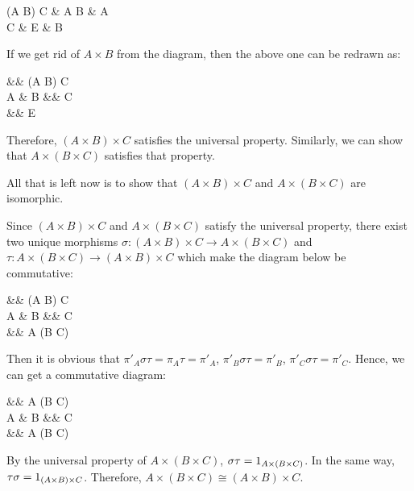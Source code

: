 {    \begin{cd}[sep=large]
        (A \times B) \times C \ar[r,"\pi_{A \times B}"] \ar[d,"\pi_C"] \& A \times B \ar[r,"\pi_A"] \ar[dr,"\pi_B"{pos=0.8}] \& A \\
        C \& E \ar[l,"f_C"]    \ar[ur,"f_A"{pos=0.8},swap] \ar[r,"f_B"] \& B
    \end{cd}

    If we get rid of $A \times B$ from the diagram, then the above one can be redrawn as:

    \begin{cd}
        \&\& (A \times B) \times C \ar[lld,"\pi_A \pi_{A \times B}",swap,bend right=20pt] \ar[ld,"\pi_B \pi_{A \times B}"] \ar[rd,"\pi_C"] \\
        A \& B \&\& C \\
        \&\& E \ar[llu,"f_A",bend left=20pt] \ar[lu,"f_B",swap]  \ar[ur,"f_C"]
    \end{cd}

    Therefore, $(A \times B) \times C$ satisfies the universal property. Similarly, we can show that $A \times (B \times C)$ satisfies that property.

    All that is left now is to show that $(A \times B) \times C$ and $A \times (B \times C)$ are isomorphic.

    Since $(A \times B) \times C$ and $A \times (B \times C)$ satisfy the universal property, there exist two unique morphisms $\sigma : (A \times B) \times C \to A \times (B \times C)$ and $\tau : A \times (B \times C) \to (A \times B) \times C$ which make the diagram below be commutative:

    \begin{cd}
        \&\& (A \times B) \times C \ar[lld,"\pi_A",swap,bend right=20pt] \ar[ld,"\pi_B"]  \ar[rd,"\pi_C"] \\
        A \& B \&\& C \\
        \&\& A \times (B \times C) \ar[llu,"\pi'_A",bend left=20pt] \ar[lu,"\pi'_B",swap]  \ar[ur,"\pi'_C"]
    \end{cd}

    Then it is obvious that $\pi'_A \sigma \tau = \pi_A \tau = \pi'_A$, $\pi'_B \sigma \tau = \pi'_B$, $\pi'_C \sigma \tau = \pi'_C$. Hence, we can get a commutative diagram:

    \begin{cd}
        \&\& A \times (B \times C) \ar[lld,"\pi'_A",swap,bend right=20pt] \ar[ld,"\pi'_B"]  \ar[rd,"\pi'_C"] \\
        A \& B \&\& C \\
        \&\& A \times (B \times C) \ar[llu,"\pi'_A",bend left=20pt] \ar[lu,"\pi'_B",swap] \ar[ur,"\pi'_C"]
    \end{cd}

    By the universal property of $A \times (B \times C)$, $\sigma \tau = \mathrm{1}_{A \times (B \times C)}$. In the same way, $\tau \sigma = \mathrm{1}_{(A \times B) \times C}$. Therefore, $A \times (B \times C) \cong (A \times B) \times C$.
}

